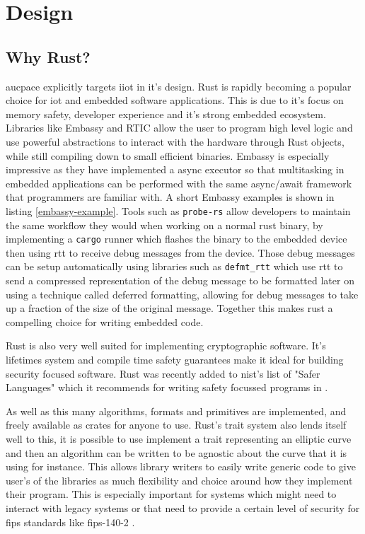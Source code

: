 \chapter{Design}

\section{Why Rust?}
\label{sec:why-rust}

\gls{aucpace} explicitly targets \gls{iiot} in it's design.
Rust is rapidly becoming a popular choice for \gls{iot} and embedded software applications.
This is due to it's focus on memory safety, developer experience and it's strong embedded ecosystem.
Libraries like Embassy and RTIC allow the user to program high level logic and use powerful abstractions to interact with the hardware through Rust objects, while still compiling down to small efficient binaries.
Embassy is especially impressive as they have implemented a async executor so that multitasking in embedded applications can be performed with the same async/await framework that programmers are familiar with.
A short Embassy examples is shown in listing \ref{embassy-example}.
Tools such as \texttt{probe-rs} allow developers to maintain the same workflow they would when working on a normal rust binary, by implementing a \texttt{cargo} runner which flashes the binary to the embedded device then using \gls{rtt} to receive debug messages from the device.
Those debug messages can be setup automatically using libraries such as \texttt{defmt\_rtt} which use \gls{rtt} to send a compressed representation of the debug message to be formatted later on using a technique called deferred formatting, allowing for debug messages to take up a fraction of the size of the original message.
Together this makes rust a compelling choice for writing embedded code.

\medskip{}


Rust is also very well suited for implementing cryptographic software.
It's lifetimes system and compile time safety guarantees make it ideal for building security focused software.
Rust was recently added to \gls{nist}'s list of "Safer Languages" which it recommends for writing safety focussed programs in \cite{nist-safer-languages}.

As well as this many algorithms, formats and primitives are implemented, and freely available as crates for anyone to use.
Rust's trait system also lends itself well to this, it is possible to use implement a trait representing an elliptic curve and then an algorithm can be written to be agnostic about the curve that it is using for instance.
This allows library writers to easily write generic code to give user's of the libraries as much flexibility and choice around how they implement their program.
This is especially important for systems which might need to interact with legacy systems or that need to provide a certain level of security for \gls{fips} standards like \gls{fips}-140-2 \cite{fips-140-2}.

